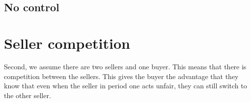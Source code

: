 \documentclass{article}
\begin{document}
\subsection{No control}

\section{Seller competition}

Second, we assume there are two sellers and one buyer. This means that there is competition between the sellers. This gives the buyer the advantage that they know that even when the seller in period one acts unfair, they can still switch to the other seller.  





\end{document}
